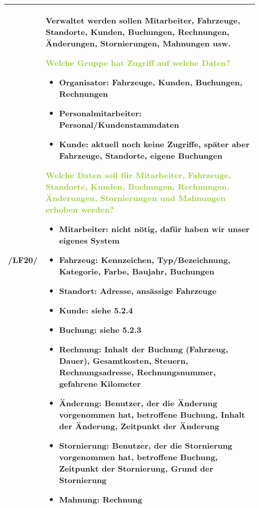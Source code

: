 \begin{tabular}{l | p{13cm}}
    \hline
    /LF20/ & Verwaltet werden sollen Mitarbeiter, Fahrzeuge, Standorte, Kunden, Buchungen, Rechnungen, Änderungen, Stornierungen, Mahnungen usw.

    \textcolor{YellowGreen}{Welche Gruppe hat Zugriff auf welche Daten?}

    \textcolor{NavyBlue}{
        \begin{itemize}
            \item Organisator: Fahrzeuge, Kunden, Buchungen, Rechnungen
            \item Personalmitarbeiter: Personal/Kundenstammdaten
            \item Kunde: aktuell noch keine Zugriffe, später aber Fahrzeuge, Standorte, eigene Buchungen
        \end{itemize} 
    }

    \textcolor{YellowGreen}{Welche Daten soll für Mitarbeiter, Fahrzeuge, Standorte, Kunden, Buchungen, Rechnungen, Änderungen, Stornierungen und Mahnungen erhoben werden?}

    \textcolor{NavyBlue}{
        \begin{itemize}
            \item  Mitarbeiter: nicht nötig, dafür haben wir unser eigenes System
            \item Fahrzeug: Kennzeichen, Typ/Bezeichnung, Kategorie, Farbe, Baujahr, Buchungen 
            \item Standort: Adresse, ansässige Fahrzeuge 
            \item Kunde: siehe 5.2.4
            \item Buchung: siehe 5.2.3
            \item Rechnung: Inhalt der Buchung (Fahrzeug, Dauer), Gesamtkosten, Steuern, Rechnungsadresse, Rechnungsnummer, gefahrene Kilometer 
            \item Änderung: Benutzer, der die Änderung vorgenommen hat, betroffene Buchung, Inhalt der Änderung, Zeitpunkt der Änderung 
            \item Stornierung: Benutzer, der die Stornierung vorgenommen hat, betroffene Buchung, Zeitpunkt der Stornierung, Grund der Stornierung 
            \item Mahnung: Rechnung
        \end{itemize}       
    } \\
    \hline
\end{tabular}

